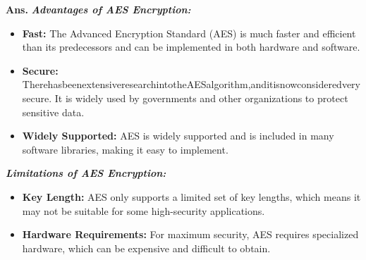 \documentclass{article}
\begin{document}
\begin{enumerate}
	\textbf{Ans.} \textbf{\textit{Advantages of AES Encryption:}}
	\begin{itemize}
		\item \textbf{Fast:} The Advanced Encryption Standard (AES) is much faster and efficient than its predecessors and can be implemented in both hardware and software.
		\item \textbf{Secure:} TherehasbeenextensiveresearchintotheAESalgorithm,anditisnowconsideredverysecure. It is widely used by governments and other organizations to protect sensitive data.
		\item \textbf{Widely Supported:} AES is widely supported and is included in many software libraries, making it easy to implement.
	\end{itemize}
	\textbf{\textit{Limitations of AES Encryption:}}
	\begin{itemize}
		\item \textbf{Key Length:} AES only supports a limited set of key lengths, which means it may not be suitable for
		some high-security applications.
		\item \textbf{Hardware Requirements:} For maximum security, AES requires specialized hardware, which can be expensive and difficult to obtain.
	\end{itemize}
\end{enumerate}
\end{document}
